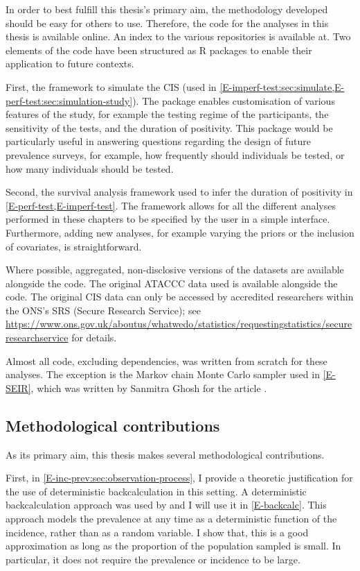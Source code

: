 \documentclass[thesis.tex]{subfiles}
\begin{document}
In order to best fulfill this thesis's primary aim, the methodology developed should be easy for others to use.
Therefore, the code for the analyses in this thesis is available online.
An index to the various repositories is available at.
Two elements of the code have been structured as R packages to enable their application to future contexts.

First, the framework to simulate the CIS (used in \cref{E-imperf-test:sec:simulate,E-perf-test:sec:simulation-study}).
The package enables customisation of various features of the study, for example the testing regime of the participants, the sensitivity of the tests, and the duration of positivity.
This package would be particularly useful in answering questions regarding the design of future prevalence surveys, for example, how frequently should individuals be tested, or how many individuals should be tested.

Second, the survival analysis framework used to infer the duration of positivity in \cref{E-perf-test,E-imperf-test}.
The framework allows for all the different analyses performed in these chapters to be specified by the user in a simple interface.
Furthermore, adding new analyses, for example varying the priors or the inclusion of covariates, is straightforward.

Where possible, aggregated, non-disclosive versions of the datasets are available alongside the code.
The original ATACCC data used is available alongside the code.
The original CIS data can only be accessed by accredited researchers within the ONS's SRS (Secure Research Service); see \url{https://www.ons.gov.uk/aboutus/whatwedo/statistics/requestingstatistics/secureresearchservice} for details.

Almost all code, excluding dependencies, was written from scratch for these analyses.
The exception is the Markov chain Monte Carlo sampler used in \cref{E-SEIR}, which was written by Sanmitra Ghosh for the article \textcite{ghoshApproximate}.

\subsection{Methodological contributions}

As its primary aim, this thesis makes several methodological contributions.

First, in \cref{E-inc-prev:sec:observation-process}, I provide a theoretic justification for the use of deterministic backcalculation in this setting.
A deterministic backcalculation approach was used by \textcite{abbottCISincidence} and I will use it in \cref{E-backcalc}.
This approach models the prevalence at any time as a deterministic function of the incidence, rather than as a random variable.
I show that, this is a good approximation as long as the proportion of the population sampled is small.
In particular, it does not require the prevalence or incidence to be large.
\end{document}
